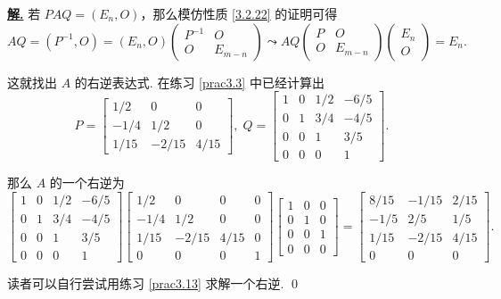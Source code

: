 \documentclass[10pt,openany]{article}
\theoremstyle{thmstyle} %
\theoremstyle{defstyle} %
\theoremstyle{prostyle} %
\theoremstyle{exastyle}
\theoremstyle{remstyle}
\newenvironment{solution}{\par\underline{\textbf{解.}} \;\fangsong}{\qed\par}
\begin{document}
\begin{solution}
	若 \( PAQ=(E_n,O) \)，那么模仿性质 \ref{3.2.22} 的证明可得
	\[ AQ=(P^{-1},O)=(E_n,O)\begin{pmatrix}
		P^{-1} & O \\
		O & E_{m-n}
	\end{pmatrix} \leadsto AQ\begin{pmatrix}
	P & O \\
	O & E_{m-n}
	\end{pmatrix}\begin{pmatrix}
	E_n  \\
	O 
	\end{pmatrix}=E_n. \]
	
	这就找出 \( A \) 的右逆表达式. 在练习 \ref{prac3.3} 中已经计算出
	\[ P=\begin{bmatrix}
		1/2 & 0 & 0 \\
		-1/4 & 1/2 & 0 \\
		1/15 & -2/15 & 4/15
	\end{bmatrix}, \; Q=\begin{bmatrix}
	1 & 0 & 1/2 & -6/5 \\
	0 & 1 & 3/4 & -4/5 \\
	0 & 0 & 1 & 3/5 \\
	0 & 0 & 0 & 1
	\end{bmatrix}. \]
	
	
	那么 \( A \) 的一个右逆为
	\[ \begin{bmatrix}
		1 & 0 & 1/2 & -6/5 \\
		0 & 1 & 3/4 & -4/5 \\
		0 & 0 & 1 & 3/5 \\
		0 & 0 & 0 & 1
	\end{bmatrix}\begin{bmatrix}
	1/2 & 0 & 0 & 0 \\
	-1/4 & 1/2 & 0 & 0 \\
	1/15 & -2/15 & 4/15 & 0 \\
	0 & 0 & 0 & 1
	\end{bmatrix}\begin{bmatrix}
	1 & 0 & 0 \\
	0 & 1 & 0 \\
    0 & 0 & 1 \\
	0 & 0 & 0
	\end{bmatrix}=\begin{bmatrix}
	8/15 & -1/15 & 2/15 \\
	-1/5 &  2/5  & 1/5 \\
	1/15 & -2/15 & 4/15 \\
	0    &  0    & 0
	\end{bmatrix}. \]
	
	读者可以自行尝试用练习 \ref{prac3.13} 求解一个右逆.
\end{solution}
\end{document}
